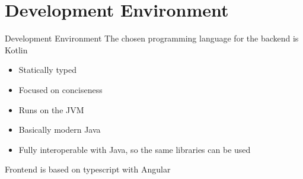 \section{Development Environment}

\begin{frame}{Development Environment}
    The chosen programming language for the backend is Kotlin

    \begin{itemize}
        \item Statically typed
        \item Focused on conciseness
        \item Runs on the JVM
        \item Basically modern Java
        \item Fully interoperable with Java, so the same libraries can be used
    \end{itemize}

    Frontend is based on typescript with Angular
\end{frame}
